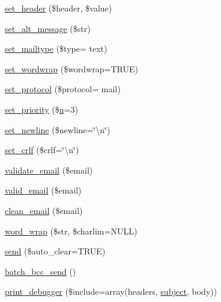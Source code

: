 \begin{DoxyCompactItemize}
\item 
\hyperlink{class_c_i___email_aff40701d50f18c87942be79f8b447247}{set\+\_\+header} (\$header, \$value)
\item 
\hyperlink{class_c_i___email_a18f0b650e6e9a859e1936a41e86fb3a6}{set\+\_\+alt\+\_\+message} (\$str)
\item 
\hyperlink{class_c_i___email_af4cf982fc57024935544c955f4a92723}{set\+\_\+mailtype} (\$type= \textquotesingle{}text\textquotesingle{})
\item 
\hyperlink{class_c_i___email_a6abb8d5f17213eba1e243ca633da8084}{set\+\_\+wordwrap} (\$wordwrap=T\+R\+U\+E)
\item 
\hyperlink{class_c_i___email_a13cb2538ed74c83ea51880a17d90ea78}{set\+\_\+protocol} (\$protocol= \textquotesingle{}mail\textquotesingle{})
\item 
\hyperlink{class_c_i___email_aee3ae37c0bf5f8aca34f6e872efd66b8}{set\+\_\+priority} (\$\hyperlink{cli_2error__general_8php_ace0fd03cd383f20ce6ea63247a207294}{n}=3)
\item 
\hyperlink{class_c_i___email_a095be9606f6f063ee6e1af81b53d405e}{set\+\_\+newline} (\$newline=\char`\"{}\textbackslash{}n\char`\"{})
\item 
\hyperlink{class_c_i___email_a8bfdf8b14a9dcf4ee18b52c0a2afa833}{set\+\_\+crlf} (\$crlf=\char`\"{}\textbackslash{}n\char`\"{})
\item 
\hyperlink{class_c_i___email_a1907f0dba44e2968b8260dbc5770550f}{validate\+\_\+email} (\$email)
\item 
\hyperlink{class_c_i___email_abe07a23d74d453da8fb639b5c3951873}{valid\+\_\+email} (\$email)
\item 
\hyperlink{class_c_i___email_ab8139994bc1b1bee3d2750b627cdd0c6}{clean\+\_\+email} (\$email)
\item 
\hyperlink{class_c_i___email_aa3a2a5440115b320a0c2fcea542e546a}{word\+\_\+wrap} (\$str, \$charlim=N\+U\+L\+L)
\item 
\hyperlink{class_c_i___email_a547a65a81ba2d1f98cc15121a45dab11}{send} (\$auto\+\_\+clear=T\+R\+U\+E)
\item 
\hyperlink{class_c_i___email_a889f14cabfcfe05b5c0d0dbbb8f557e0}{batch\+\_\+bcc\+\_\+send} ()
\item 
\hyperlink{class_c_i___email_a11f22e40cb1409ee7569c0abc15fae09}{print\+\_\+debugger} (\$include=array(\textquotesingle{}headers\textquotesingle{}, \textquotesingle{}\hyperlink{class_c_i___email_aaa61b3aaa6cc4c90e26686e4bf41587a}{subject}\textquotesingle{}, \textquotesingle{}body\textquotesingle{}))
\end{DoxyCompactItemize}
